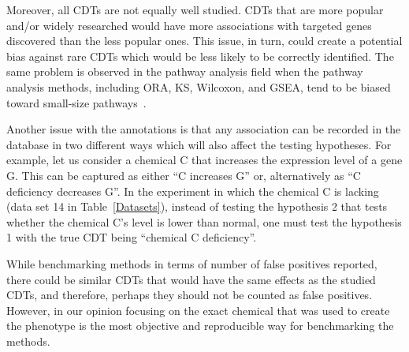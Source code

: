 Moreover, all CDTs are not equally well studied. CDTs that are more popular and/or widely researched would have more associations with targeted genes discovered than the less popular ones.
This issue, in turn, could create a potential bias against rare CDTs which would be less likely to be correctly identified.
The same problem is observed in the pathway analysis field when the pathway analysis methods, including ORA, KS, Wilcoxon, and GSEA, tend to be biased toward small-size pathways~\cite{nguyen2019identifying}.

Another issue with the annotations is that any association can be recorded in the database in two different ways which will also affect the testing hypotheses.
For example, let us consider a chemical C that increases  the   expression level of a gene G. This can be captured as either ``C increases G'' or, alternatively as ``C deficiency decreases G''. 
In the experiment in which the chemical C is lacking (data set 14 in Table~\ref{Datasets}), instead of testing the hypothesis 2 that tests whether the chemical C's level is lower than normal, one must test the hypothesis 1 with the true CDT being ``chemical C deficiency''.


While benchmarking methods in terms of number of false positives reported, there could be similar CDTs that would have the same effects as the studied CDTs, and therefore, perhaps they should not be counted as false positives. However, in our opinion focusing on the exact chemical that was used to create the phenotype is the most objective and reproducible way for benchmarking the methods.

